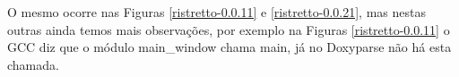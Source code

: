 O mesmo ocorre nas Figuras \ref{ristretto-0.0.11} e \ref{ristretto-0.0.21}, mas nestas outras ainda temos mais observações, por exemplo na Figuras \ref{ristretto-0.0.11} o GCC diz que o módulo main\_window chama main, já no Doxyparse não há esta chamada.

\begin{figure}
\center
{}
\qquad
{}

\end{figure}
